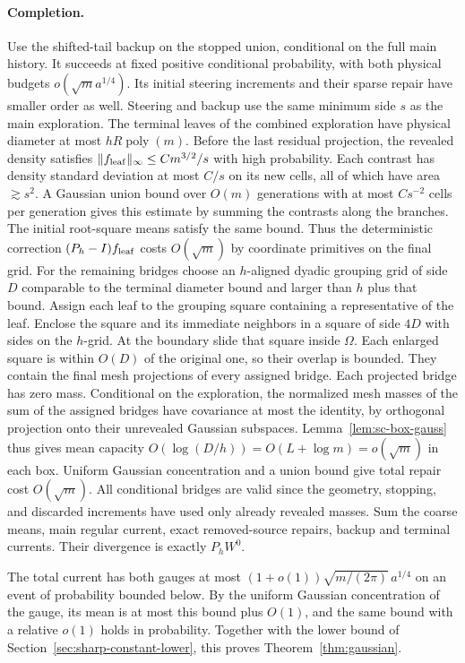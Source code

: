 \documentclass[11pt]{article}
\newcommand{\1}{\mathbf{1}}
\numberwithin{equation}{section}
\begin{document}
\paragraph{Completion.}
Use the shifted-tail backup on the stopped union, conditional
on the full main history. It succeeds at fixed positive
conditional probability, with both physical budgets
$o(\sqrt m a^{1/4})$. Its initial steering increments and their
sparse repair have smaller order as well. Steering and backup
use the same minimum side $s$ as the main exploration. The
terminal leaves of the combined exploration have physical
diameter at most \(hR\operatorname{poly}(m)\).
Before the last residual projection, the revealed density satisfies
\(\|f_{\rm leaf}\|_\infty\le C m^{3/2}/s\) with high probability.
Each contrast has density standard deviation at most \(C/s\)
on its new cells, all of which have area \(\gtrsim s^2\).
A Gaussian union bound over \(O(m)\) generations with at most
\(Cs^{-2}\) cells per generation gives this estimate by summing
the contrasts along the branches. The initial root-square means
satisfy the same bound. Thus the deterministic correction
\((P_h-I)f_{\rm leaf}\) costs \(O(\sqrt m)\) by coordinate
primitives on the final grid. For the remaining bridges choose
an $h$-aligned dyadic grouping grid of side $D$ comparable to
the terminal diameter bound and larger than $h$ plus that bound.
Assign each leaf to the grouping square containing a representative
of the leaf. Enclose the square and its immediate neighbors in
a square of side \(4D\) with sides on the \(h\)-grid. At the boundary
slide that square inside \(\Omega\). Each enlarged square is within
\(O(D)\) of the original one, so their overlap is bounded. They
contain the final mesh projections of every assigned bridge. Each projected bridge has zero mass.
Conditional on the exploration, the normalized mesh masses of the
sum of the assigned bridges have covariance at most the identity,
by orthogonal projection onto their unrevealed Gaussian subspaces.
Lemma~\ref{lem:sc-box-gauss} thus gives mean capacity
$O(\log(D/h))=O(L+\log m)=o(\sqrt m)$ in each box.
Uniform Gaussian concentration and a union bound give total
repair cost $O(\sqrt m)$. All conditional bridges
are valid since the geometry, stopping, and discarded increments
have used only already revealed masses. Sum the coarse means,
main regular current, exact removed-source repairs, backup and
terminal currents. Their divergence is exactly $P_hW^0$.



The total current has both gauges at most
\((1+o(1))\sqrt{m/(2\pi)}\,a^{1/4}\) on an event of probability
bounded below. By the uniform Gaussian concentration of the gauge,
its mean is at most this bound plus \(O(1)\), and the same bound
with a relative \(o(1)\) holds in probability. Together with the
lower bound of Section~\ref{sec:sharp-constant-lower}, this proves
Theorem~\ref{thm:gaussian}.
\end{document}
